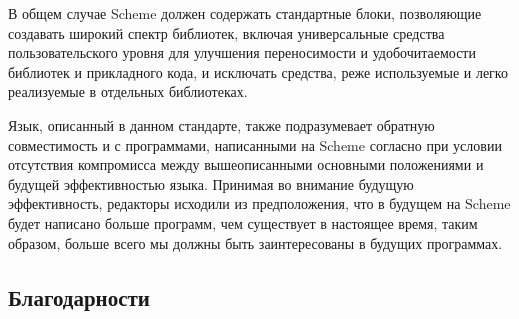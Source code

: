 В общем случае Scheme должен содержать стандартные блоки, позволяющие создавать широкий спектр
библиотек, включая универсальные средства пользовательского уровня для улучшения переносимости и
удобочитаемости библиотек и прикладного кода, и исключать средства, реже используемые и легко
реализуемые в отдельных библиотеках.

Язык, описанный в данном стандарте, также подразумевает обратную совместимость и с программами,
написанными на Scheme согласно  при условии отсутствия компромисса между вышеописанными
основными положениями и будущей эффективностью языка. Принимая во внимание будущую эффективность,
редакторы исходили из предположения, что в будущем на Scheme будет написано больше программ,
чем существует в настоящее время, таким образом, больше всего мы должны быть
заинтересованы в будущих программах.\vspace{3mm}

\subsection*{Благодарности}\vspace{4mm}

